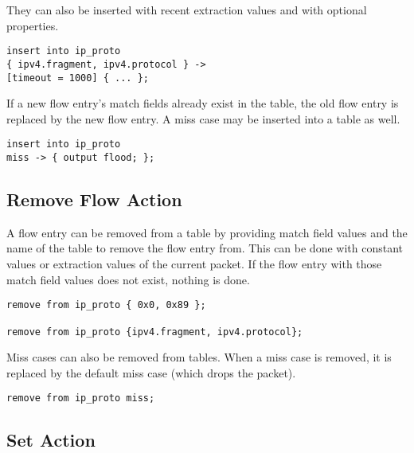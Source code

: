 They can also be inserted with recent extraction values and with
optional properties.

\begin{codepage}
\begin{lstlisting}
insert into ip_proto
{ ipv4.fragment, ipv4.protocol } ->
[timeout = 1000] { ... };
\end{lstlisting}
\end{codepage}

If a new flow entry's match fields already exist in the table, the old flow
entry is replaced by the new flow entry. A miss case may be inserted into a
table as well.

\begin{codepage}
\begin{lstlisting}
insert into ip_proto
miss -> { output flood; };
\end{lstlisting}
\end{codepage}

\subsection{Remove Flow Action} \label{tut:remove_flow_action}

A flow entry can be removed from a table by providing match field values and the
name of the table to remove the flow entry from. This can be done with constant
values or extraction values of the current packet. If the flow entry with
those match field values does not exist, nothing is done.

\begin{codepage}
\begin{lstlisting}
remove from ip_proto { 0x0, 0x89 };

remove from ip_proto {ipv4.fragment, ipv4.protocol};
\end{lstlisting}
\end{codepage}

Miss cases can also be removed from tables. When a miss case is removed, it is
replaced by the default miss case (which drops the packet).

\begin{codepage}
\begin{lstlisting}
remove from ip_proto miss;
\end{lstlisting}
\end{codepage}

\subsection{Set Action} \label{tut:set_action}

